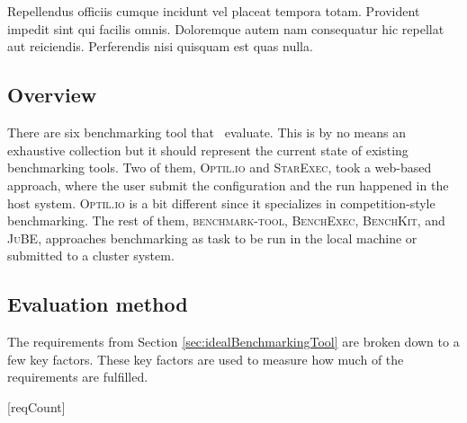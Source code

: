 \chapter{\babTiga}
\label{ch:priorWorks}

Repellendus officiis cumque incidunt vel placeat tempora totam. Provident impedit sint qui facilis omnis. Doloremque autem nam consequatur hic repellat aut reiciendis. Perferendis nisi quisquam est quas nulla.


\section{Overview}

There are six benchmarking tool that \first~evaluate.
This is by no means an exhaustive collection but it should represent the current state of existing benchmarking tools.
Two of them, \textsc{Optil.io} and \textsc{StarExec}, took a web-based approach, where the user submit the configuration and the run happened in the host system.
\textsc{Optil.io} is a bit different since it specializes in competition-style benchmarking.
The rest of them, \textsc{benchmark-tool}, \textsc{BenchExec}, \textsc{BenchKit}, and \textsc{JuBE}, approaches benchmarking as task to be run in the local machine or submitted to a cluster system.


\section{Evaluation method}

The requirements from Section \ref{sec:idealBenchmarkingTool} are broken down to a few key factors.
These key factors are used to measure how much of the requirements are fulfilled.

[reqCount]
\newcommand{\reqLabel}[1]{
	\setcounter{reqFactorCount}{0}
	\addtocounter{reqCount}{1}
	\arabic{reqCount}.
	#1
}
\newcommand{\reqFactor}[1]{
	\addtocounter{reqFactorCount}{1}
	(\alph{reqFactorCount}) #1
}

